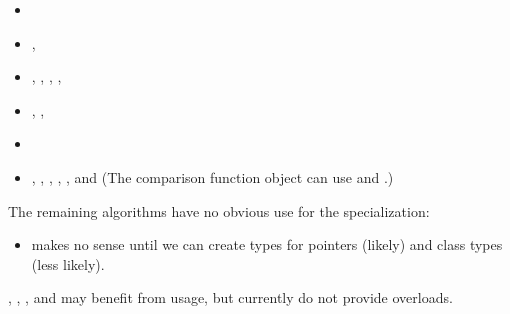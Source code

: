 \begin{itemize}
  \item {}
  \item {}, 
  \item {}, , , , 
  \item {}, , 
  \item {}
  \item {}, , , , , and  (The comparison function object can use  and .)
\end{itemize}

The remaining algorithms have no obvious use for the specialization:
\begin{itemize}
  \item {} makes no sense until we can create  types for pointers (likely) and class types (less likely).
\end{itemize}

, , , and  may benefit from \simd usage, but currently do not provide  overloads.

